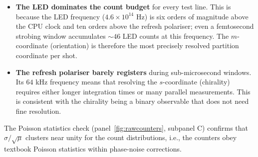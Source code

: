 \documentclass[twocolumn,11pt,a4paper]{article}
\theoremstyle{thmstyle}
\theoremstyle{axiomstyle}
\theoremstyle{definition}
\theoremstyle{remark}
\begin{document}
\begin{itemize}[nosep]
\item \textbf{The LED dominates the count budget} for every test line. This is because the LED frequency ($4.6\times 10^{14}$ Hz) is six orders of magnitude above the CPU clock and ten orders above the refresh polariser; even a femtosecond strobing window accumulates $\sim 46$ LED counts at this frequency. The $m$-coordinate (orientation) is therefore the most precisely resolved partition coordinate per shot.
\item \textbf{The refresh polariser barely registers} during sub-microsecond windows. Its $64$ kHz frequency means that resolving the $s$-coordinate (chirality) requires either longer integration times or many parallel measurements. This is consistent with the chirality being a binary observable that does not need fine resolution.
\end{itemize}

The Poisson statistics check (panel~\ref{fig:rawcounters}, subpanel C) confirms that $\sigma / \sqrt{\mu}$ clusters near unity for the count distributions, i.e., the counters obey textbook Poisson statistics within phase-noise corrections.
\end{document}
